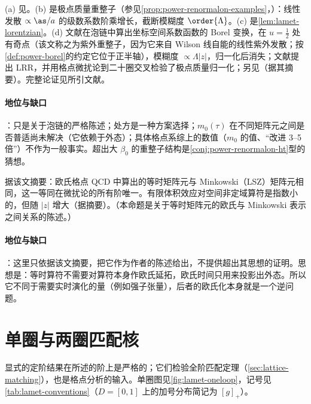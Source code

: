 \begin{proofsketch}
(a) 见\cite{Ji:2020brr}。(b) 是极点质量重整子\cite{Beneke:1994sw,Bigi:1994em}（参见\cref{prop:power-renormalon-examples}，\tagP）：线性发散 $\propto\as/a$ 的级数系数阶乘增长，截断模糊度 $\order{\Lambda}$。(c) 是\cref{lem:lamet-lorentzian}。(d) 文献\cite{Braun:2018brg}在泡链中算出坐标空间系数函数的 Borel 变换，在 $u=\frac12$ 处有奇点（该文称之为紫外重整子，因为它来自 Wilson 线自能的线性紫外发散；按\cref{def:power-borel}的约定它位于正半轴），模糊度 $\propto\Lambda|z|$，归一化后消失；文献\cite{Zhang:2023bxs}提出 LRR，并用格点微扰论到二十圈交叉检验了极点质量归一化；另见\cite{Holligan:2023rex}（据其摘要）。完整论证见所引文献。
\end{proofsketch}

\paragraph{地位与缺口}
\tagP：只是关于泡链的严格陈述；处方是一种方案选择；$m_0(\tau)$ 在不同矩阵元之间是否普适尚未解决（它依赖于外态\cite{Zhang:2023bxs}）；具体格点系综上的数值（$m_0$ 的值、“改进 3--5 倍”）不作为一般事实。超出大 $\beta_0$ 的重整子结构是\cref{conj:power-renormalon-ht}型的猜想。

\begin{proposition}\label{prop:lamet-euclid-minkowski}
据该文摘要\cite{Briceno:2017cpo}：欧氏格点 QCD 中算出的等时矩阵元与 Minkowski（LSZ）矩阵元相同，这一等同在微扰论的所有阶唯一。有限体积效应对空间非定域算符是指数小的，但随 $|z|$ 增大（据\cite{Briceno:2018lfj}摘要）。（本命题是关于等时矩阵元的欧氏与 Minkowski 表示之间关系的陈述。）
\end{proposition}

\paragraph{地位与缺口}
\tagA：这里只依据该文摘要，把它作为作者的陈述给出，不提供超出其思想的证明。思想是：等时算符不需要对算符本身作欧氏延拓，欧氏时间只用来投影出外态。所以它不同于需要实时演化的量（例如强子张量），后者的欧氏化本身就是一个逆问题。

\section{单圈与两圈匹配核}\label{sec:lamet-oneloop}

显式的定阶结果在所述的阶上是严格的；它们检验全阶匹配定理（\cref{sec:lattice-matching}），也是格点分析的输入。单圈图见\cref{fig:lamet-oneloop}，记号见\cref{tab:lamet-conventions}（$D=[0,1]$ 上的加号分布简记为 $[g]_+$）。

